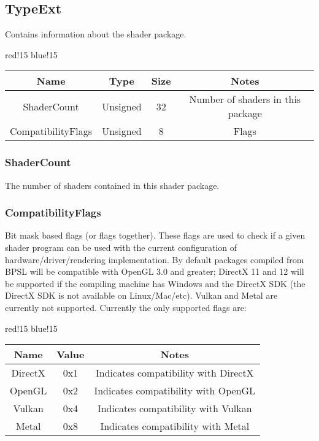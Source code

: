 \subsection{TypeExt}
Contains information about the shader package.
\begin{center}
    {
        {red!15}
        {blue!15}
        \begin{tabular}{|c|c|c|c|}
            \hline
            \textbf{Name} & \textbf{Type} & \textbf{Size} & \textbf{Notes} \\
    
            \hline\hline
            ShaderCount & Unsigned & 32 & Number of shaders in this package \\
            CompatibilityFlags & Unsigned & 8 & Flags \\
            \hline
        \end{tabular}
    }
\end{center}

\subsubsection{ShaderCount}
The number of shaders contained in this shader package.

\subsubsection{CompatibilityFlags}
Bit mask based flags (or flags together). These flags are used to check if a given shader program can be used with the current configuration of hardware/driver/rendering implementation. By default packages compiled from BPSL will be compatible with OpenGL 3.0 and greater; DirectX 11 and 12 will be supported if the compiling machine has Windows and the DirectX SDK (the DirectX SDK is not available on Linux/Mac/etc).\newline
Vulkan and Metal are currently not supported.\newline
Currently the only supported flags are:
\begin{center}
    {
        {red!15}
        {blue!15}
        \begin{tabular}{|c|c|c|}
            \hline
            \textbf{Name} & \textbf{Value} & \textbf{Notes} \\
    
            \hline\hline
            DirectX & 0x1 & Indicates compatibility with DirectX \cite{DirectX} \\
            OpenGL & 0x2 & Indicates compatibility with OpenGL \cite{OpenGL} \\
            Vulkan & 0x4 & Indicates compatibility with Vulkan \cite{Vulkan} \\
            Metal & 0x8 & Indicates compatibility with Metal \cite{Metal} \\
            \hline
        \end{tabular}
    }
\end{center}

